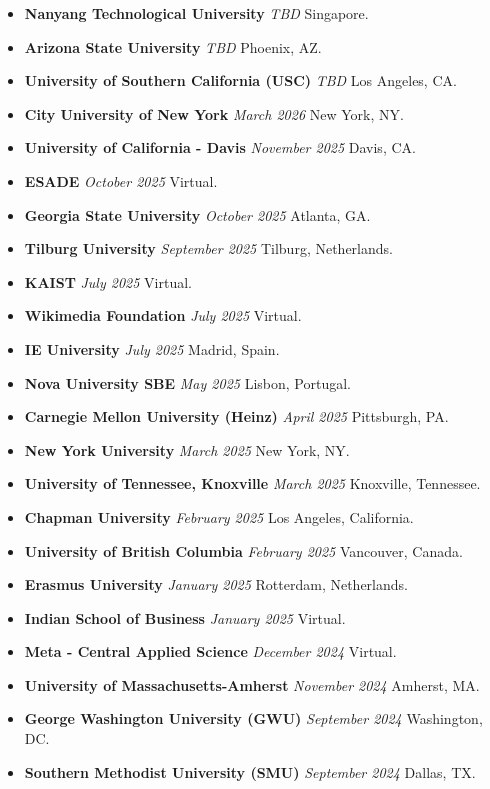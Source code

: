 \documentclass[10.5pt,letterpaper,sans]{moderncv}        %
\begin{document}
\begin{itemize}
\item \textbf{Nanyang Technological University} \textit{TBD} Singapore.
\item \textbf{Arizona State University} \textit{TBD} Phoenix, AZ.
\item \textbf{University of Southern California (USC)} \textit{TBD} Los Angeles, CA.
\item \textbf{City University of New York} \textit{March 2026} New York, NY.
\item \textbf{University of California - Davis} \textit{November 2025} Davis, CA.
\item \textbf{ESADE} \textit{October 2025} Virtual.
\item \textbf{Georgia State University} \textit{October 2025} Atlanta, GA.
\item \textbf{Tilburg University} \textit{September 2025} Tilburg, Netherlands.
\item \textbf{KAIST} \textit{July 2025} Virtual.
\item \textbf{Wikimedia Foundation} \textit{July 2025} Virtual.
\item \textbf{IE University} \textit{July 2025} Madrid, Spain.
\item \textbf{Nova University {SBE}} \textit{May 2025} Lisbon, Portugal.
\item \textbf{Carnegie Mellon University (Heinz)} \textit{April 2025} Pittsburgh, PA.
\item \textbf{New York University} \textit{March 2025} New York, NY.
\item \textbf{University of Tennessee, Knoxville} \textit{March 2025} Knoxville, Tennessee.
\item \textbf{Chapman University} \textit{February 2025} Los Angeles, California.
\item \textbf{University of British Columbia} \textit{February 2025} Vancouver, Canada.
\item \textbf{Erasmus University} \textit{January 2025} Rotterdam, Netherlands.
\item \textbf{Indian School of Business} \textit{January 2025} Virtual.
\item \textbf{Meta - Central Applied Science} \textit{December 2024} Virtual.
\item \textbf{University of Massachusetts-Amherst} \textit{November 2024} Amherst, MA.
\item \textbf{George Washington University (GWU)} \textit{September 2024} Washington, DC.
\item \textbf{Southern Methodist University (SMU)} \textit{September 2024} Dallas, TX.

\end{itemize}
\end{document}
